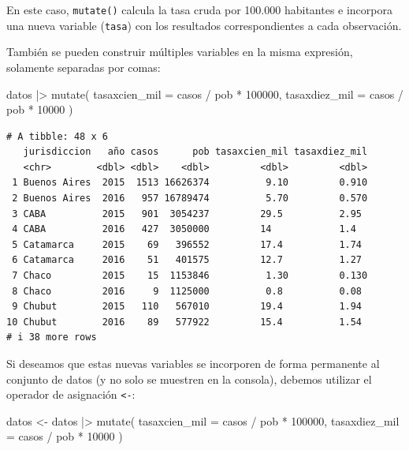 \documentclass[
  spanish,
  a4paper,
]{scrbook}
\newenvironment{Shaded}{\begin{snugshade}}{\end{snugshade}}
\newcommand{\AttributeTok}[1]{\textcolor[rgb]{0.40,0.45,0.13}{#1}}
\newcommand{\DecValTok}[1]{\textcolor[rgb]{0.68,0.00,0.00}{#1}}
\newcommand{\FunctionTok}[1]{\textcolor[rgb]{0.28,0.35,0.67}{#1}}
\newcommand{\NormalTok}[1]{\textcolor[rgb]{0.00,0.23,0.31}{#1}}
\newcommand{\OtherTok}[1]{\textcolor[rgb]{0.00,0.23,0.31}{#1}}
\newcommand{\SpecialCharTok}[1]{\textcolor[rgb]{0.37,0.37,0.37}{#1}}
\begin{document}
En este caso, \texttt{mutate()} calcula la tasa cruda por 100.000
habitantes e incorpora una nueva variable (\texttt{tasa}) con los
resultados correspondientes a cada observación.

También se pueden construir múltiples variables en la misma expresión,
solamente separadas por comas:

\begin{Shaded}
\begin{Highlighting}[]
\NormalTok{datos }\SpecialCharTok{|\textgreater{}}
  \FunctionTok{mutate}\NormalTok{(}
    \AttributeTok{tasaxcien\_mil =}\NormalTok{ casos }\SpecialCharTok{/}\NormalTok{ pob }\SpecialCharTok{*} \DecValTok{100000}\NormalTok{,}
    \AttributeTok{tasaxdiez\_mil =}\NormalTok{ casos }\SpecialCharTok{/}\NormalTok{ pob }\SpecialCharTok{*} \DecValTok{10000}
\NormalTok{  )}
\end{Highlighting}
\end{Shaded}

\begin{verbatim}
# A tibble: 48 x 6
   jurisdiccion   año casos      pob tasaxcien_mil tasaxdiez_mil
   <chr>        <dbl> <dbl>    <dbl>         <dbl>         <dbl>
 1 Buenos Aires  2015  1513 16626374          9.10         0.910
 2 Buenos Aires  2016   957 16789474          5.70         0.570
 3 CABA          2015   901  3054237         29.5          2.95 
 4 CABA          2016   427  3050000         14            1.4  
 5 Catamarca     2015    69   396552         17.4          1.74 
 6 Catamarca     2016    51   401575         12.7          1.27 
 7 Chaco         2015    15  1153846          1.30         0.130
 8 Chaco         2016     9  1125000          0.8          0.08 
 9 Chubut        2015   110   567010         19.4          1.94 
10 Chubut        2016    89   577922         15.4          1.54 
# i 38 more rows
\end{verbatim}

Si deseamos que estas nuevas variables se incorporen de forma permanente
al conjunto de datos (y no solo se muestren en la consola), debemos
utilizar el operador de asignación \texttt{\textless{}-}:

\begin{Shaded}
\begin{Highlighting}[]
\NormalTok{datos }\OtherTok{\textless{}{-}}\NormalTok{ datos }\SpecialCharTok{|\textgreater{}}
  \FunctionTok{mutate}\NormalTok{(}
    \AttributeTok{tasaxcien\_mil =}\NormalTok{ casos }\SpecialCharTok{/}\NormalTok{ pob }\SpecialCharTok{*} \DecValTok{100000}\NormalTok{,}
    \AttributeTok{tasaxdiez\_mil =}\NormalTok{ casos }\SpecialCharTok{/}\NormalTok{ pob }\SpecialCharTok{*} \DecValTok{10000}
\NormalTok{  )}
\end{Highlighting}
\end{Shaded}
\end{document}
